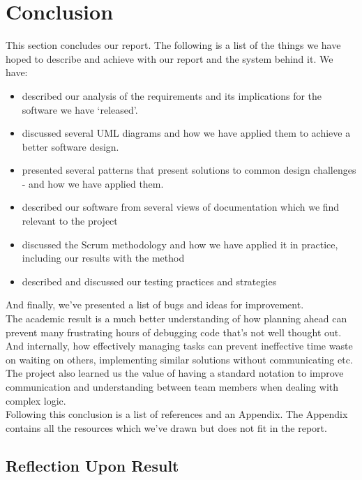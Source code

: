 \section{Conclusion}
This section concludes our report. The following is a list of the things we have hoped to describe and achieve with our report and the system behind it. We have:
\begin{itemize}
\item described our analysis of the requirements and its implications for the software we have `released'. 
\item discussed several UML diagrams and how we have applied them to achieve a better software design. 
\item presented several patterns that present solutions to common design challenges - and how we have applied them. 
\item described our software from several views of documentation which we find relevant to the project
\item discussed the Scrum methodology and how we have applied it in practice, including our results with the method
\item described and discussed our testing practices and strategies
\end{itemize}
And finally, we've presented a list of bugs and ideas for improvement.\\
The academic result is a much better understanding of how planning ahead can prevent many frustrating hours of debugging code that's not well thought out. And internally, how effectively managing tasks can prevent ineffective time waste on waiting on others, implementing similar solutions without communicating etc. The project also learned us the value of having a standard notation to improve communication and understanding between team members when dealing with complex logic.\\
Following this conclusion is a list of references and an Appendix. The Appendix contains all the resources which we've drawn but does not fit in the report.\\
\subsection{Reflection Upon Result}
\newpage